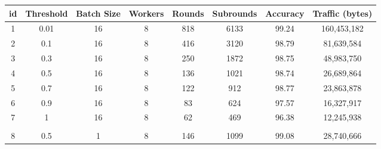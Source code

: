 \newpage

\begin{table}[H]
    \begin{tabular}{|c|c|c|c|c|c|c|c|}
        \hline
        \textbf{id}            & \textbf{Threshold}    & \textbf{Batch Size}   & \textbf{Workers}      & \textbf{Rounds}       & \textbf{Subrounds}    & \textbf{Accuracy}     & \textbf{Traffic (bytes)} \\
        \hline
        1                      & 0.01                  & 16                    & 8                     & 818                   & 6133                  & 99.24                 & 160,453,182              \\
        2                      & 0.1                   & 16                    & 8                     & 416                   & 3120                  & 98.79                 & 81,639,584               \\
        3                      & 0.3                   & 16                    & 8                     & 250                   & 1872                  & 98.75                 & 48,983,750               \\
        4                      & 0.5                   & 16                    & 8                     & 136                   & 1021                  & 98.74                 & 26,689,864               \\
        5                      & 0.7                   & 16                    & 8                     & 122                   & 912                   & 98.77                 & 23,863,878               \\
        6                      & 0.9                   & 16                    & 8                     & 83                    & 624                   & 97.57                 & 16,327,917               \\
        7                      & 1                     & 16                    & 8                     & 62                    & 469                   & 96.38                 & 12,245,938               \\
        \hline
        \multicolumn{1}{|l|}{} & \multicolumn{1}{l|}{} & \multicolumn{1}{l|}{} & \multicolumn{1}{l|}{} & \multicolumn{1}{l|}{} & \multicolumn{1}{l|}{} & \multicolumn{1}{l|}{} & \multicolumn{1}{l|}{}    \\
        \hline
        8                      & 0.5                   & 1                     & 8                     & 146                   & 1099                  & 99.08                 & 28,740,666               \\

\end{tabular}
\end{table}
